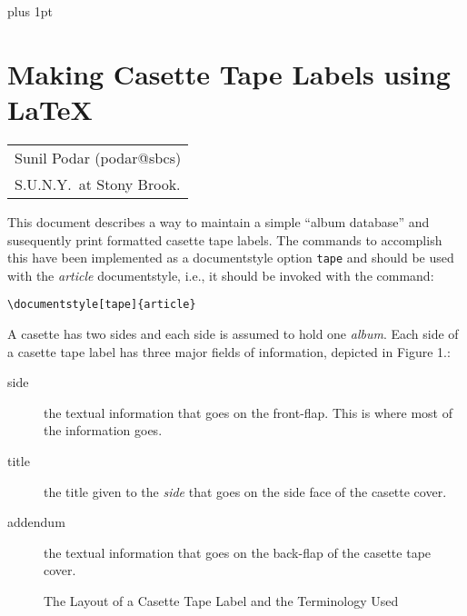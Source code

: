 \setlength{\textwidth}{6.5in}
\setlength{\textheight}{9in}
\setlength{\oddsidemargin}{1in}
\renewcommand{\baselinestretch}{1.25}
\parindent=15pt
\parskip=6pt plus 1pt
\pagestyle{plain}


\section*{Making Casette Tape Labels using \LaTeX}
\begin{flushright}
\begin{tabular}{@{}l@{}}
Sunil Podar (podar@sbcs)\\
S.U.N.Y.\ at Stony Brook.\\

\end{tabular}
\end{flushright}

\vspace*{8mm}
This document describes a way to maintain a simple ``album database'' and
susequently print formatted casette tape labels. The commands to accomplish
this have been implemented as a documentstyle option {\tt tape} and should be
used with the {\it article} documentstyle, i.e., it should be invoked with
the command:

\verb|\documentstyle[tape]{article}|

A casette has two sides and each side is assumed to hold one {\it album}.
Each side of a casette tape label has three major fields of information,
depicted in Figure 1.:

\begin{description}
\item[side\hfill] the textual information that goes on the front-flap. This
is where most of the information goes.
\item[title\hfill] the title given to the {\it side} that goes on the side
face of the casette cover.
\item[addendum\hfill] the textual information that goes on the back-flap of
the casette tape cover.
\end{description}

\begin{figure}[hb]
\begin{center}
\renewcommand{\globaltapeid}{\footnotesize global\\tapeid}
\small
{}%
\caption[]{The Layout of a Casette Tape Label and the Terminology Used}
\end{center}
\end{figure}

